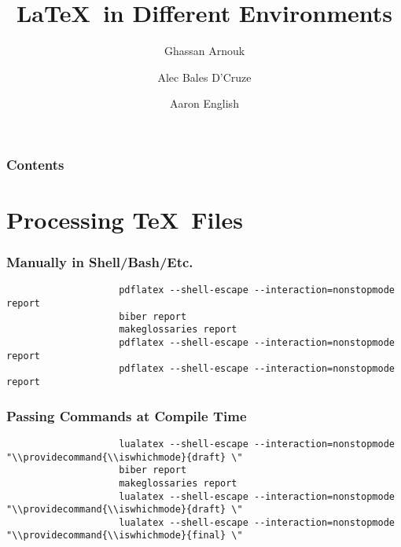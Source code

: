 \documentclass{beamer}
\title{\LaTeX~in Different Environments}
\author{Ghassan Arnouk \and
            Alec Bales D'Cruze \and
            Aaron English}
\begin{document}
    \begin{frame}
        \titlepage
    \end{frame}
    \begin{frame}
        \frametitle{Contents}
        \tableofcontents
    \end{frame}
    \section{Processing \TeX~Files}
        \begin{frame}[fragile]
            \frametitle{Manually in Shell/Bash/Etc.}
            \begin{centering}
                \begin{verbatim}
                    pdflatex --shell-escape --interaction=nonstopmode report
                    biber report
                    makeglossaries report
                    pdflatex --shell-escape --interaction=nonstopmode report
                    pdflatex --shell-escape --interaction=nonstopmode report
                \end{verbatim}
            \end{centering}
        \end{frame}
        \begin{frame}[fragile]
            \frametitle{Passing Commands at Compile Time}
            \begin{centering}
                \begin{verbatim}
                    lualatex --shell-escape --interaction=nonstopmode "\\providecommand{\\iswhichmode}{draft} \"
                    biber report
                    makeglossaries report
                    lualatex --shell-escape --interaction=nonstopmode "\\providecommand{\\iswhichmode}{draft} \"
                    lualatex --shell-escape --interaction=nonstopmode "\\providecommand{\\iswhichmode}{final} \"
                \end{verbatim}
            \end{centering}
        \end{frame}
\end{document}
